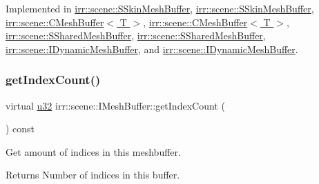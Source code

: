 Implemented in \hyperlink{structirr_1_1scene_1_1SSkinMeshBuffer_a94faa430425d73fbb6cab74ac65af1c1}{irr\+::scene\+::\+S\+Skin\+Mesh\+Buffer}, \hyperlink{structirr_1_1scene_1_1SSkinMeshBuffer_a94faa430425d73fbb6cab74ac65af1c1}{irr\+::scene\+::\+S\+Skin\+Mesh\+Buffer}, \hyperlink{classirr_1_1scene_1_1CMeshBuffer_a99abc7d5f5a9f34221c58a598b33ce3a}{irr\+::scene\+::\+C\+Mesh\+Buffer$<$ T $>$}, \hyperlink{classirr_1_1scene_1_1CMeshBuffer_a99abc7d5f5a9f34221c58a598b33ce3a}{irr\+::scene\+::\+C\+Mesh\+Buffer$<$ T $>$}, \hyperlink{structirr_1_1scene_1_1SSharedMeshBuffer_ad9c7307fcad8c9b8db3db98f95863196}{irr\+::scene\+::\+S\+Shared\+Mesh\+Buffer}, \hyperlink{structirr_1_1scene_1_1SSharedMeshBuffer_ad9c7307fcad8c9b8db3db98f95863196}{irr\+::scene\+::\+S\+Shared\+Mesh\+Buffer}, \hyperlink{classirr_1_1scene_1_1IDynamicMeshBuffer_a3480aae22a6701453a19b4c4cbcf2555}{irr\+::scene\+::\+I\+Dynamic\+Mesh\+Buffer}, and \hyperlink{classirr_1_1scene_1_1IDynamicMeshBuffer_a3480aae22a6701453a19b4c4cbcf2555}{irr\+::scene\+::\+I\+Dynamic\+Mesh\+Buffer}.

\mbox{\label{classirr_1_1scene_1_1IMeshBuffer_a96e08662e15b1205516b87ada3301551}} 
\subsubsection{\texorpdfstring{get\+Index\+Count()}{getIndexCount()}\hspace{0.1cm}{\footnotesize\ttfamily [1/2]}}
{\footnotesize\ttfamily virtual \hyperlink{namespaceirr_a0416a53257075833e7002efd0a18e804}{u32} irr\+::scene\+::\+I\+Mesh\+Buffer\+::get\+Index\+Count (\begin{DoxyParamCaption}{ }\end{DoxyParamCaption}) const\hspace{0.3cm}{\ttfamily [pure virtual]}}



Get amount of indices in this meshbuffer. 

\begin{DoxyReturn}{Returns}
Number of indices in this buffer. 
\end{DoxyReturn}


